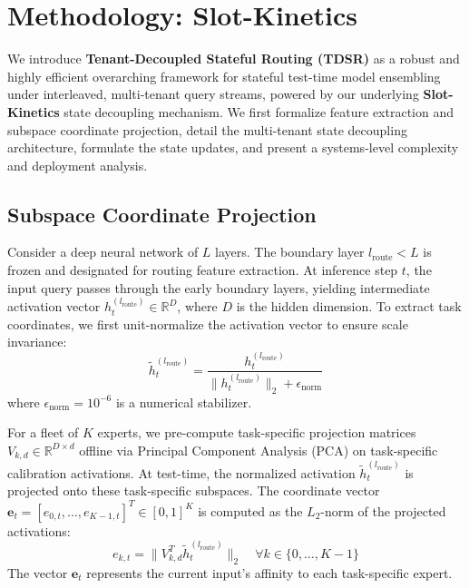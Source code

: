\section{Methodology: Slot-Kinetics}
\label{sec:method}

We introduce \textbf{Tenant-Decoupled Stateful Routing (TDSR)} as a robust and highly efficient overarching framework for stateful test-time model ensembling under interleaved, multi-tenant query streams, powered by our underlying \textbf{Slot-Kinetics} state decoupling mechanism. We first formalize feature extraction and subspace coordinate projection, detail the multi-tenant state decoupling architecture, formulate the state updates, and present a systems-level complexity and deployment analysis.

\subsection{Subspace Coordinate Projection}
Consider a deep neural network of $L$ layers. The boundary layer $l_{\text{route}} < L$ is frozen and designated for routing feature extraction. At inference step $t$, the input query passes through the early boundary layers, yielding intermediate activation vector $h_t^{(l_{\text{route}})} \in \mathbb{R}^D$, where $D$ is the hidden dimension. To extract task coordinates, we first unit-normalize the activation vector to ensure scale invariance:
\begin{equation}
\tilde{h}_t^{(l_{\text{route}})} = \frac{h_t^{(l_{\text{route}})}}{\|h_t^{(l_{\text{route}})}\|_2 + \epsilon_{\text{norm}}}
\end{equation}
where $\epsilon_{\text{norm}} = 10^{-6}$ is a numerical stabilizer. 

For a fleet of $K$ experts, we pre-compute task-specific projection matrices $V_{k, d} \in \mathbb{R}^{D \times d}$ offline via Principal Component Analysis (PCA) on task-specific calibration activations. At test-time, the normalized activation $\tilde{h}_t^{(l_{\text{route}})}$ is projected onto these task-specific subspaces. The coordinate vector $\mathbf{e}_t = [e_{0, t}, \dots, e_{K-1, t}]^T \in [0, 1]^K$ is computed as the $L_2$-norm of the projected activations:
\begin{equation}
e_{k, t} = \|V_{k, d}^T \tilde{h}_t^{(l_{\text{route}})}\|_2 \quad \forall k \in \{0, \dots, K-1\}
\end{equation}
The vector $\mathbf{e}_t$ represents the current input's affinity to each task-specific expert.


